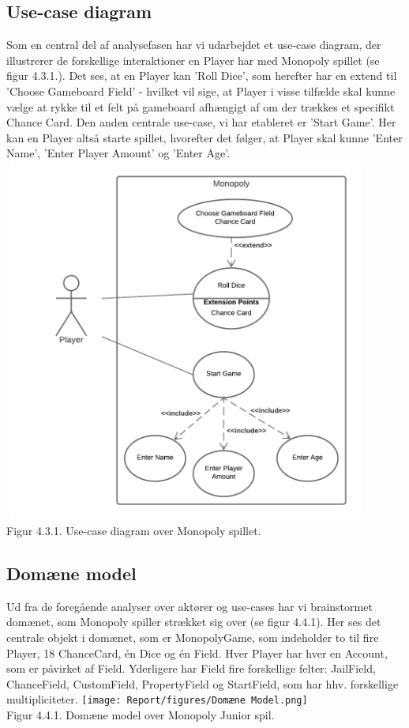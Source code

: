 \begin{flushleft}
\subsection{Use-case diagram}
    Som en central del af analysefasen har vi udarbejdet et use-case diagram, der illustrerer de forskellige interaktioner en Player har med Monopoly spillet (se figur 4.3.1.). Det ses, at en Player kan 'Roll Dice', som herefter har en extend til 'Choose Gameboard Field' - hvilket vil sige, at Player i visse tilfælde skal kunne vælge at rykke til et felt på gameboard afhængigt af om der trækkes et specifikt Chance Card.
    \addlinespace
    Den anden centrale use-case, vi har etableret er 'Start Game'. Her kan en Player altså starte spillet, hvorefter det følger, at Player skal kunne 'Enter Name', 'Enter Player Amount' og 'Enter Age'.
    \includegraphics[width=0.9\textwidth, height = 12cm]{Report/figures/Use case diagram CDIO del3.png}~\\[0.5cm]
    Figur 4.3.1. Use-case diagram over Monopoly spillet.

\subsection{Domæne model}
    Ud fra de foregående analyser over aktører og use-cases har vi brainstormet domænet, som Monopoly spiller strækket sig over (se figur 4.4.1). Her ses det centrale objekt i domænet, som er MonopolyGame, som indeholder to til fire Player, 18 ChanceCard, én Dice og én Field. Hver Player har hver en Account, som er påvirket af Field. Yderligere har Field fire forskellige felter: JailField, ChanceField, CustomField, PropertyField og StartField, som har hhv. forskellige multipliciteter. \texttt{[image: Report/figures/Domæne Model.png]}~\\[1cm]
    Figur 4.4.1. Domæne model over Monopoly Junior spil.


\end{flushleft}
